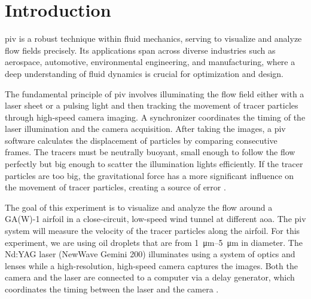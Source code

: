 \chapter{Introduction}
\label{cp:introduction}
\acrfull{piv} is a robust technique within fluid mechanics, serving to visualize and analyze flow fields precisely. Its applications span across diverse industries such as aerospace, automotive, environmental engineering, and manufacturing, where a deep understanding of fluid dynamics is crucial for optimization and design.

The fundamental principle of \acrshort{piv} involves illuminating the flow field either with a laser sheet or a pulsing light and then tracking the movement of tracer particles through high-speed camera imaging. A synchronizer coordinates the timing of the laser illumination and the camera acquisition. After taking the images, a \acrshort{piv} software calculates the displacement of particles by comparing consecutive frames. The tracers must be neutrally buoyant, small enough to follow the flow perfectly but big enough to scatter the illumination lights efficiently. If the tracer particles are too big, the gravitational force has a more significant influence on the movement of tracer particles, creating a source of error \citep{hu2024}.

The goal of this experiment is to visualize and analyze the flow around a GA(W)-1 airfoil in a close-circuit, low-speed wind tunnel at different \acrshort{aoa}. The \acrshort{piv} system will measure the velocity of the tracer particles along the airfoil. For this experiment, we are using oil droplets that are from \qtyrange{1}{5}{\micro\meter} in diameter. The Nd:YAG laser (NewWave Gemini 200) illuminates using a system of optics and lenses while a high-resolution, high-speed camera captures the images. Both the camera and the laser are connected to a computer via a delay generator, which coordinates the timing between the laser and the camera \citep{lab11-manual}.